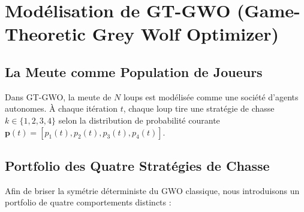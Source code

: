 \section{Modélisation de GT-GWO (Game-Theoretic Grey Wolf Optimizer)}

\subsection{La Meute comme Population de Joueurs}
Dans GT-GWO, la meute de $N$ loups est modélisée comme une société d'agents autonomes. À chaque itération $t$, chaque loup tire une stratégie de chasse $k \in \{1, 2, 3, 4\}$ selon la distribution de probabilité courante $\mathbf{p}(t) = [p_1(t), p_2(t), p_3(t), p_4(t)]$.

\subsection{Portfolio des Quatre Stratégies de Chasse}
Afin de briser la symétrie déterministe du GWO classique, nous introduisons un portfolio de quatre comportements distincts :

